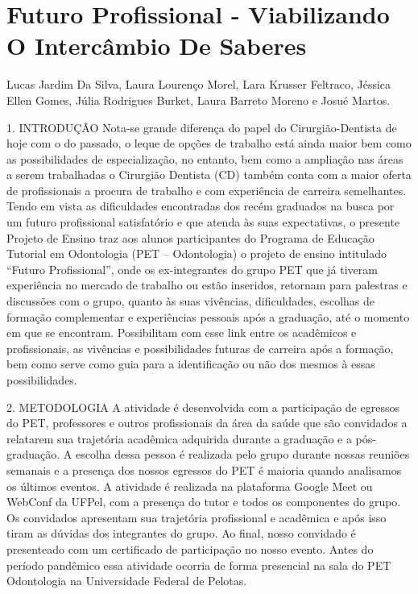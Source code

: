 


\section*{Futuro Profissional - Viabilizando O Intercâmbio De Saberes}

Lucas Jardim Da Silva, Laura Lourenço Morel, Lara Krusser Feltraco, Jéssica Ellen Gomes, Júlia Rodrigues Burket, Laura Barreto Moreno e Josué Martos.

1. INTRODUÇÃO
Nota-se grande diferença do papel do Cirurgião-Dentista de hoje com o do passado, o leque de  opções de trabalho está ainda maior bem como as possibilidades de especialização, no entanto,  bem como a ampliação nas áreas a serem trabalhadas o Cirurgião Dentista (CD) também conta  com a maior oferta de profissionais a procura de trabalho e com experiência de carreira semelhantes. Tendo em vista as dificuldades encontradas dos recém graduados na busca por um futuro  profissional satisfatório e que atenda às suas expectativas, o presente Projeto de Ensino traz aos alunos participantes do Programa de Educação Tutorial em Odontologia (PET – Odontologia) o  projeto de ensino intitulado “Futuro Profissional”, onde os ex-integrantes do grupo PET que já  tiveram experiência no mercado de trabalho ou estão inseridos, retornam para palestras e discussões com o grupo, quanto às suas vivências, dificuldades, escolhas de formação complementar e experiências pessoais após a graduação, até o momento em que se encontram. Possibilitam com esse link entre os acadêmicos e profissionais, as vivências e possibilidades futuras de carreira após a formação, bem como serve como guia para a identificação ou não dos mesmos à essas possibilidades.

2. METODOLOGIA
A atividade é desenvolvida com a participação de egressos do PET, professores e outros profissionais da área da saúde que são convidados a relatarem sua trajetória acadêmica adquirida durante a graduação e a pós-graduação. A escolha dessa pessoa é realizada pelo grupo durante nossas reuniões semanais e a presença dos nossos egressos do PET é maioria quando analisamos os últimos eventos. A atividade é realizada na plataforma Google Meet ou WebConf da UFPel, com a presença do tutor e todos os componentes do grupo. Os convidados apresentam sua trajetória profissional e acadêmica e após isso tiram as dúvidas dos integrantes do grupo. Ao final, nosso convidado é presenteado com um certificado de participação no nosso evento. Antes do período pandêmico essa atividade ocorria de forma presencial na sala do PET Odontologia na Universidade Federal de Pelotas. 

